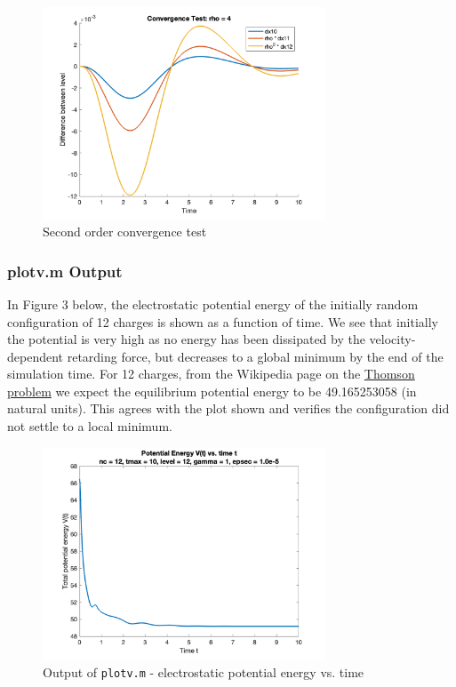 \documentclass[10pt]{article}
\def\code#1{\texttt{#1}} %
\begin{document}
\begin{figure}[H]
\centering
\includegraphics[width=0.75\textwidth]{ConvTest_4.png}
\caption{Second order convergence test}
\end{figure}

\subsubsection*{plotv.m Output}

In Figure 3 below, the electrostatic potential energy of the initially random configuration of 12
charges is shown as a function of time. We see that initially the potential is very high as no energy
has been dissipated by the velocity-dependent retarding force, but decreases to a global minimum by 
the end of the simulation time. For 12 charges, from the Wikipedia page on the 
\href{https://en.wikipedia.org/wiki/Thomson_problem}{Thomson problem} we expect the equilibrium potential 
energy to be 49.165253058 (in natural units). This agrees with the plot shown and verifies the configuration
did not settle to a local minimum. 

\begin{figure}[H]
\centering
\includegraphics[width=0.75\textwidth]{plotv_output.png}
\caption{Output of \code{plotv.m} - electrostatic potential energy vs. time}
\end{figure}
\end{document}
